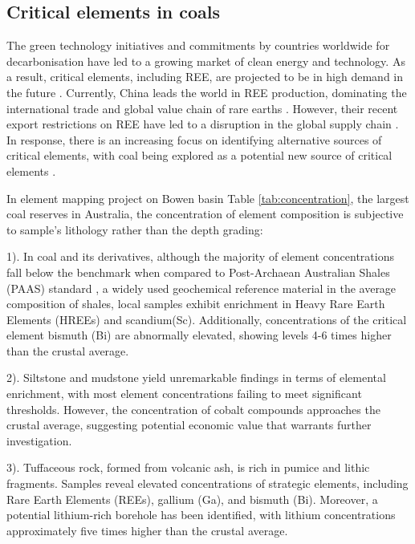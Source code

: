 \documentclass[11pt,a4paper,]{article}
\begin{document}
\subsection{Critical elements in coals}\label{critical-elements-in-coals}

The green technology initiatives and commitments by countries worldwide for decarbonisation have led to a growing market of clean energy and technology. As a result, critical elements, including REE, are projected to be in high demand in the future \autocite{usde2017}. Currently, China leads the world in REE production, dominating the international trade and global value chain of rare earths \autocite{us2024mineral}. However, their recent export restrictions on REE have led to a disruption in the global supply chain \autocite{MANCHERI2015262}. In response, there is an increasing focus on identifying alternative sources of critical elements, with coal being explored as a potential new source of critical elements \autocite{Hodgkinson2021}.

In \textcite{Hodgkinson2020} element mapping project on Bowen basin Table \ref{tab:concentration}, the largest coal reserves in Australia, the concentration of element composition is subjective to sample's lithology rather than the depth grading:

1). In coal and its derivatives, although the majority of element concentrations fall below the benchmark when compared to Post-Archaean Australian Shales (PAAS) standard \autocite{McLennan2011}, a widely used geochemical reference material in the average composition of shales, local samples exhibit enrichment in Heavy Rare Earth Elements (HREEs) and scandium(Sc). Additionally, concentrations of the critical element bismuth (Bi) are abnormally elevated, showing levels 4-6 times higher than the crustal average.

2). Siltstone and mudstone yield unremarkable findings in terms of elemental enrichment, with most element concentrations failing to meet significant thresholds. However, the concentration of cobalt compounds approaches the crustal average, suggesting potential economic value that warrants further investigation.

3). Tuffaceous rock, formed from volcanic ash, is rich in pumice and lithic fragments. Samples reveal elevated concentrations of strategic elements, including Rare Earth Elements (REEs), gallium (Ga), and bismuth (Bi). Moreover, a potential lithium-rich borehole has been identified, with lithium concentrations approximately five times higher than the crustal average.
\end{document}
